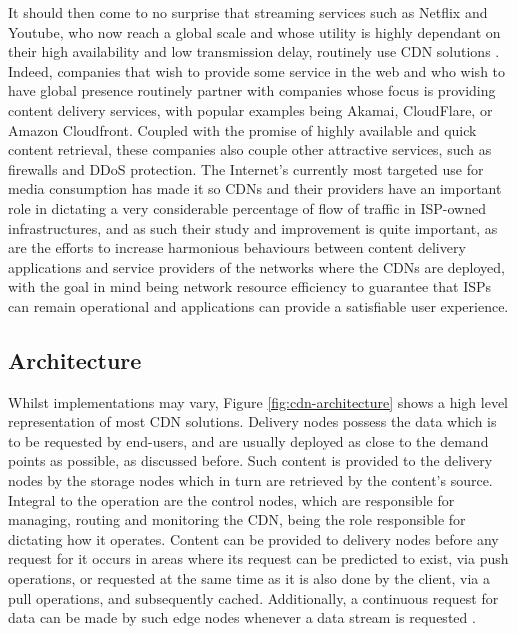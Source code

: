 \documentclass[
  oneside,
  11pt, a4paper,
  footinclude=true,
  headinclude=true,
  cleardoublepage=empty
]{scrbook}
\begin{document}
	It should then come to no surprise that streaming services such as Netflix and Youtube, who now reach a global scale and whose utility is highly dependant on their high availability and low transmission delay, routinely use CDN solutions \cite{cookbook}. Indeed, companies that wish to provide some service in the web and who wish to have global presence routinely partner with companies whose focus is providing content delivery services, with popular examples being Akamai, CloudFlare, or Amazon Cloudfront. Coupled with the promise of highly available and quick content retrieval, these companies also couple other attractive services, such as firewalls and DDoS protection. The Internet's currently most targeted use for media consumption has made it so CDNs and their providers have an important role in dictating a very considerable percentage of flow of traffic in ISP-owned infrastructures, and as such their study and improvement is quite important, as are the efforts to increase harmonious behaviours between content delivery applications and service providers of the networks where the CDNs are deployed, with the goal in mind being network resource efficiency to guarantee that ISPs can remain operational and applications can provide a satisfiable user experience. 
	
	\subsection{Architecture}
	
	Whilst implementations may vary, Figure \ref{fig:cdn-architecture} shows a high level representation of most CDN solutions. Delivery nodes possess the data which is to be requested by end-users, and are usually deployed as close to the demand points as possible, as discussed before. Such content is provided to the delivery nodes by the storage nodes which in turn are retrieved by the content's source. Integral to the operation are the control nodes, which are responsible for managing, routing and monitoring the CDN, being the role responsible for dictating how it operates. Content can be provided to delivery nodes before any request for it occurs in areas where its request can be predicted to exist, via push operations, or requested at the same time as it is also done by the client, via a pull operations, and subsequently cached. Additionally, a continuous request for data can be made by such edge nodes whenever a data stream is requested \cite{cdn-guide}.
	
\end{document}
